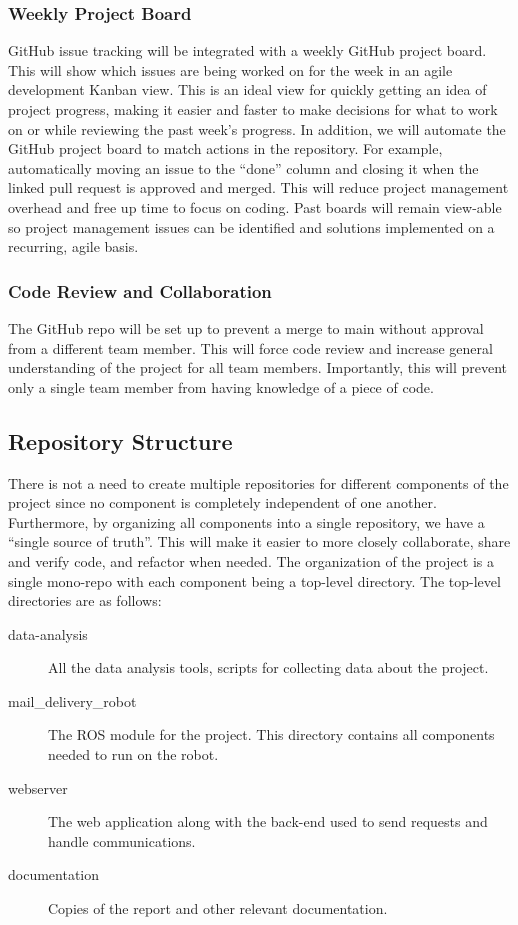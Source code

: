 \documentclass[12pt]{report}
\begin{document}
\subsubsection{Weekly Project Board}
GitHub issue tracking will be integrated with a weekly GitHub project board. This will show which issues are being worked on for the week in an agile development Kanban view. This is an ideal view for quickly getting an idea of project progress, making it easier and faster to make decisions for what to work on or while reviewing the past week's progress. In addition, we will automate the GitHub project board to match actions in the repository. For example, automatically moving an issue to the “done” column and closing it when the linked pull request is approved and merged. This will reduce project management overhead and free up time to focus on coding. Past boards will remain view-able so project management issues can be identified and solutions implemented on a recurring, agile basis.
\subsubsection{Code Review and Collaboration}
The GitHub repo will be set up to prevent a merge to main without approval from a different team member. This will force code review and increase general understanding of the project for all team members. Importantly, this will prevent only a single team member from having knowledge of a piece of code.




\subsection{Repository Structure}
There is not a need to create multiple repositories for different components of the project since no component is completely independent of one another. Furthermore, by organizing all components into a single repository, we have a “single source of truth”. This will make it easier to more closely collaborate, share and verify code, and refactor when needed. The organization of the project is a single mono-repo with each component being a top-level directory. The top-level directories are as follows:
\begin{description}
    \item[data-analysis] All the data analysis tools, scripts for collecting data about the project.
    \item[mail\_delivery\_robot] The ROS module for the project. This directory contains all components needed to run on the robot.
    \item[webserver] The web application along with the back-end used to send requests and handle communications.
    \item[documentation] Copies of the report and other relevant documentation.
    
\end{description}
\end{document}
